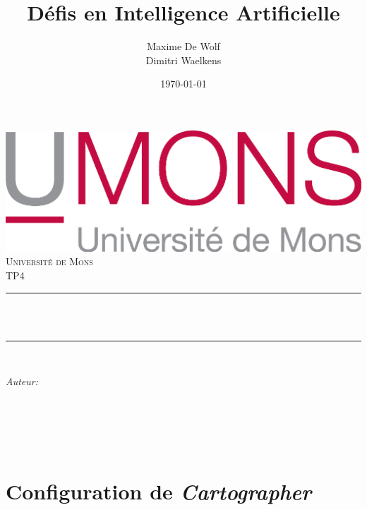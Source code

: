 \documentclass[10pt,a4paper]{article}
\title{Défis en Intelligence Artificielle}                             %
\author{Maxime De Wolf\\
		Dimitri Waelkens}                               %
\date{\today}                                           %
\makeatletter
\let\thetitle\@title
\let\theauthor\@author
\let\thedate\@date
\makeatother
\begin{document}
   	
   	
   	\begin{titlepage}
   		\centering
   		\vspace*{0.5 cm}
   		\includegraphics[scale = 0.75]{UMONS}\\[1.0 cm]   %
   		\textsc{\LARGE Université de Mons}\\[2.0 cm]   %
   		\textsc{\large TP4}\\[0.5 cm]               %
   		\rule{\linewidth}{0.2 mm} \\[0.4 cm]
   		{ \huge \bfseries \thetitle}\\
   		\rule{\linewidth}{0.2 mm} \\[1.5 cm]
   		
   		\begin{minipage}{0.4\textwidth}
   			\begin{flushleft} \large
   				\emph{Auteur:}\\
   				\theauthor
   			\end{flushleft}
   		\end{minipage}~
   		\begin{minipage}{0.4\textwidth}
   			\begin{flushright} \large
   				\emph{}                                  %
   			\end{flushright}
   		\end{minipage}\\[2 cm]
   		
   		{\large \thedate}\\[2 cm]
   		
   		\vfill
   		
   	\end{titlepage}
   	
   	
   	\section{Configuration de \textit{Cartographer}}
	
\end{document}
